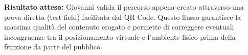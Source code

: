 \vspace{0.15cm}
\noindent\textbf{\color{culturiaRed}Risultato atteso:}
Giovanni valida il percorso appena creato attraverso una prova diretta (test field) facilitata dal QR Code. Questo flusso garantisce la massima qualità del contenuto erogato e permette di correggere eventuali incongruenze tra il posizionamento virtuale e l'ambiente fisico prima della fruizione da parte del pubblico.

